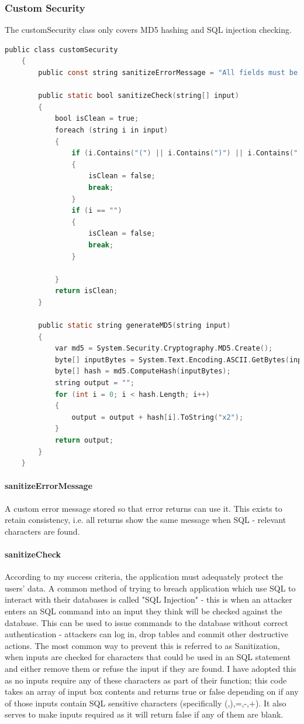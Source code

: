 ﻿\documentclass{article}
\begin{document}
    \subsubsection{Custom Security}
    The customSecurity class only covers MD5 hashing and SQL injection checking.
    \begin{lstlisting}[language=C]
    public class customSecurity
    {
        public const string sanitizeErrorMessage = "All fields must be full. The (, ), +, -, = and ' characters are not allowed in ANY fields";

        public static bool sanitizeCheck(string[] input)
        {
            bool isClean = true;
            foreach (string i in input)
            {
                if (i.Contains("(") || i.Contains(")") || i.Contains("'") || i.Contains("=") || i.Contains("-") || i.Contains("+"))
                {
                    isClean = false;
                    break;
                }
                if (i == "")
                {
                    isClean = false;
                    break;
                }

            }
            return isClean;
        }

        public static string generateMD5(string input)
        {
            var md5 = System.Security.Cryptography.MD5.Create();
            byte[] inputBytes = System.Text.Encoding.ASCII.GetBytes(input);
            byte[] hash = md5.ComputeHash(inputBytes);
            string output = "";
            for (int i = 0; i < hash.Length; i++)
            {
                output = output + hash[i].ToString("x2");
            }
            return output;
        }
    }
    \end{lstlisting}
    \paragraph{sanitizeErrorMessage}
    A custom error message stored so that error returns can use it.
    This exists to retain consistency, i.e. all returns show the same message when SQL - relevant characters are found.
    \paragraph{sanitizeCheck}
    According to my success criteria, the application must adequately protect the users' data.
    A common method of trying to breach application which use SQL to interact with their databases is called "SQL Injection" - this is when an attacker enters an SQL command into an input they think will be checked against the database.
    This can be used to issue commands to the database without correct authentication - attackers can log in, drop tables and commit other destructive actions.
    The most common way to prevent this is referred to as Sanitization, when inputs are checked for characters that could be used in an SQL statement and either remove them or refuse the input if they are found.
    I have adopted this as no inputs require any of these characters as part of their function; this code takes an array of input box contents and returns true or false depending on if any of those inputs contain SQL sensitive characters (specifically (,),=,-,+).
    It also serves to make inputs required as it will return false if any of them are blank.
\end{document}

